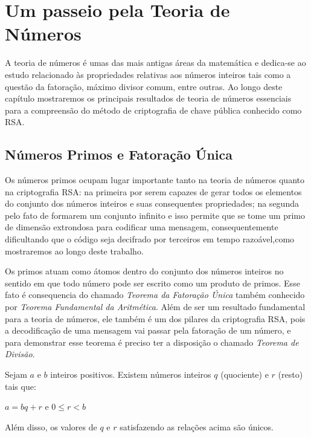 \chapter {Um passeio pela Teoria de N\'umeros}
\label{Num}


\hspace{7mm}A teoria de n\'umeros \'e umas das mais antigas \'areas da matem\'atica e dedica-se ao estudo relacionado \`as propriedades relativas aos n\'umeros inteiros tais como a quest\~ao da fatora\c{c}\~ao, m\'aximo divisor comum, entre outras. Ao longo deste cap\'itulo mostraremos os principais resultados de teoria de n\'umeros essenciais para a compreens\~ao do m\'etodo de criptografia de chave p\'ublica conhecido como RSA.



\section{N\'umeros Primos e Fatora\c{c}\~ao \'Unica}

\hspace{7mm}Os n\'umeros primos ocupam lugar importante tanto na teoria de n\'umeros quanto na criptografia RSA: na primeira por serem capazes de gerar todos os elementos do conjunto dos n\'umeros inteiros e suas consequentes propriedades; na segunda pelo fato de formarem um conjunto infinito e isso permite que se tome um primo de dimens\~ao extrondosa para codificar uma mensagem, consequentemente dificultando que o c\'odigo seja decifrado por terceiros em tempo razo\'avel,como mostraremos ao longo deste trabalho.

Os primos atuam como \'atomos dentro do conjunto dos n\'umeros inteiros no sentido em que todo n\'umero pode ser escrito como um produto de primos. Esse fato \'e consequencia do chamado \textit{Teorema da Fatora\c{c}\~ao \'Unica} tamb\'em conhecido por \textit{Teorema Fundamental da Aritm\'etica}. Al\'em de ser um resultado fundamental para a teoria de n\'umeros, ele tamb\'em \'e um dos pilares da criptografia RSA, pois a decodifica\c{c}\~ao de uma mensagem vai passar pela fatora\c{c}\~ao de um n\'umero, e para demonstrar esse teorema \'e preciso ter a disposi\c{c}\~ao o chamado \textit{Teorema de Divis\~ao}. 


\begin{Th}
Sejam $a$ e $b$ inteiros positivos. Existem n\'umeros inteiros $q$ (quociente) e $r$ (resto) tais que:	
	\begin{center}
		$a=bq+r$ e $0\leq r <b$
	\end{center}
Al\'em disso, os valores de $q$ e $r$ satisfazendo as rela\c{c}\~oes acima s\~ao \'unicos.
\end{Th} 

